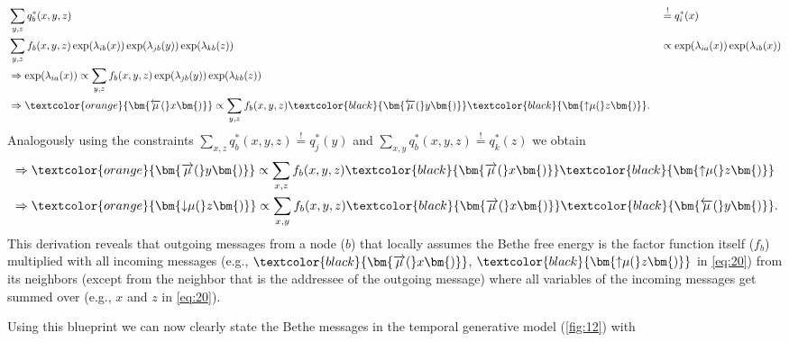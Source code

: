 \begin{alignat}{2}
     & \sum_{y,z} q_b^*(x,y,z)                                                                                                                                                                              &  & \overset{!}{=} q_i^*(x)                             \\
     & \sum_{y,z} f_b(x,y,z) \exp(\lambda_{ib}(x)) \exp(\lambda_{jb}(y)) \exp(\lambda_{kb}(z))                                                                                                              &  & \propto \exp(\lambda_{ia}(x)) \exp(\lambda_{ib}(x)) \\
     & \Rightarrow \exp(\lambda_{ia}(x))              \propto \sum_{y,z} f_b(x,y,z) \exp(\lambda_{jb}(y)) \exp(\lambda_{kb}(z))                                                                                                                                      \\
     & \Rightarrow \textcolor{orange}{\bm{\overleftarrow{\mu}(}x\bm{)}}  \propto \sum_{y,z} f_b(x,y,z) \textcolor{black}{\bm{\overleftarrow{\mu}(}y\bm{)}} \textcolor{black}{\bm{{\uparrow}{\mu}(}z\bm{)}}.
\end{alignat}
Analogously using the constraints \(\sum_{x,z} q_b^*(x,y,z) \overset{!}{=} q_j^*(y)\) and \(\sum_{x,y} q_b^*(x,y,z) \overset{!}{=} q_k^*(z)\) we obtain
\begin{alignat}{2}
     & \Rightarrow \textcolor{orange}{\bm{\overrightarrow{\mu}(}y\bm{)}} \propto \sum_{x,z} f_b(x,y,z) \textcolor{black}{\bm{\overrightarrow{\mu}(}x\bm{)}} \textcolor{black}{\bm{{\uparrow}{\mu}(}z\bm{)}} \label{eq:20} \\
     & \Rightarrow \textcolor{orange}{\bm{{\downarrow}{\mu}(}z\bm{)}} \propto \sum_{x,y} f_b(x,y,z) \textcolor{black}{\bm{\overrightarrow{\mu}(}x\bm{)}} \textcolor{black}{\bm{\overleftarrow{\mu}(}y\bm{)}}.
\end{alignat}
This derivation reveals that outgoing messages from a node (\(b\)) that locally assumes the Bethe free energy is the factor function itself (\(f_b\)) multiplied with all incoming messages (e.g., \(\textcolor{black}{\bm{\overrightarrow{\mu}(}x\bm{)}}\), \(\textcolor{black}{\bm{{\uparrow}{\mu}(}z\bm{)}}\) in \cref{eq:20}) from its neighbors (except from the neighbor that is the addressee of the outgoing message) where all variables of the incoming messages get summed over (e.g., \(x\) and \(z\) in \cref{eq:20}).

Using this blueprint we can now clearly state the Bethe messages in the temporal generative model (\cref{fig:12}) with

